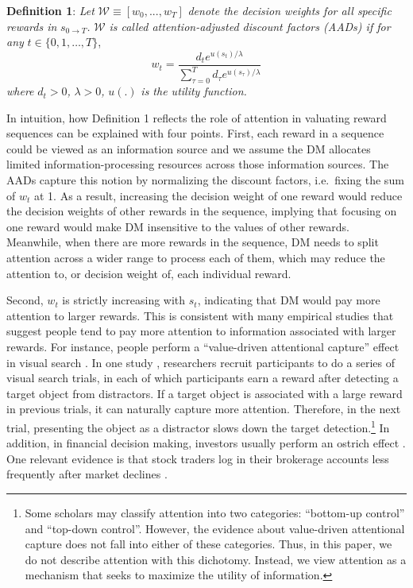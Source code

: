 \documentclass[
  12pt,
]{article}
\begin{document}
\noindent \textbf{Definition 1}: \emph{Let}
\(\mathcal{W}\equiv[w_0,...,w_T]\) \emph{denote the decision weights for
all specific rewards in} \(s_{0\rightarrow T}\)\emph{.} \(\mathcal{W}\)
\emph{is called attention-adjusted discount factors (AADs) if for any}
\(t\in\{0,1,…,T\}\),\[\tag{1}
w_t = \frac{d_te^{u(s_t)/\lambda}}{\sum_{\tau=0}^T d_\tau e^{u(s_\tau)/\lambda}} 
\]\emph{where} \(d_t > 0\)\emph{,} \(\lambda>0\)\emph{,} \(u(.)\)
\emph{is the utility function.}

In intuition, how Definition 1 reflects the role of attention in
valuating reward sequences can be explained with four points. First,
each reward in a sequence could be viewed as an information source and
we assume the DM allocates limited information-processing resources
across those information sources. The AADs capture this notion by
normalizing the discount factors, i.e.~fixing the sum of \(w_t\) at 1.
As a result, increasing the decision weight of one reward would reduce
the decision weights of other rewards in the sequence, implying that
focusing on one reward would make DM insensitive to the values of other
rewards. Meanwhile, when there are more rewards in the sequence, DM
needs to split attention across a wider range to process each of them,
which may reduce the attention to, or decision weight of, each
individual reward.

Second, \(w_t\) is strictly increasing with \(s_t\), indicating that DM
would pay more attention to larger rewards. This is consistent with many
empirical studies that suggest people tend to pay more attention to
information associated with larger rewards. For instance, people perform
a ``value-driven attentional capture'' effect in visual search
\citep{della2009learning, hickey2010reward, anderson2011value, chelazzi2013rewards, jahfari2017sensitivity}.
In one study \citep{hickey2010reward}, researchers recruit participants
to do a series of visual search trials, in each of which participants
earn a reward after detecting a target object from distractors. If a
target object is associated with a large reward in previous trials, it
can naturally capture more attention. Therefore, in the next trial,
presenting the object as a distractor slows down the target
detection.\footnote{Some scholars may classify attention into two
  categories: ``bottom-up control'' and ``top-down control''. However,
  the evidence about value-driven attentional capture does not fall into
  either of these categories. Thus, in this paper, we do not describe
  attention with this dichotomy. Instead, we view attention as a
  mechanism that seeks to maximize the utility of information.} In
addition, in financial decision making, investors usually perform an
ostrich effect \citep{galai2006ostrich, karlsson2009ostrich}. One
relevant evidence is that stock traders log in their brokerage accounts
less frequently after market declines \citep{sicherman2016financial}.
\end{document}
